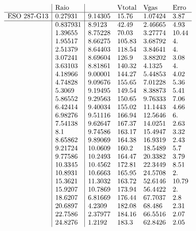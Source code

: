 \documentclass{article}
\begin{document}
\begin{doublespace}
\noindent\(\begin{array}{l|l|llll}
  & \text{Raio} & \text{} & \text{Vtotal} & \text{Vgas} & \text{Erro} \\
\hline
 \text{ESO 287-G13} & 0.27931 & 9.14305 & 15.76 & 1.07424 & 3.87 \\
\hline
  & 0.837931 & 8.9123 & 42.49 & 2.46665 & 4.93 \\
  & 1.39655 & 8.75228 & 70.03 & 3.27774 & 10.44 \\
  & 1.95517 & 8.66275 & 105.83 & 3.68792 & 4. \\
  & 2.51379 & 8.64403 & 118.54 & 3.84641 & 4. \\
  & 3.07241 & 8.69604 & 126.9 & 3.88202 & 3.08 \\
  & 3.63103 & 8.81861 & 140.32 & 4.1325 & 4. \\
  & 4.18966 & 9.00001 & 144.27 & 5.44853 & 4.02 \\
  & 4.74828 & 9.09676 & 155.65 & 7.01228 & 5.36 \\
  & 5.3069 & 9.19495 & 149.54 & 8.38873 & 5.41 \\
  & 5.86552 & 9.29563 & 150.65 & 9.76333 & 7.06 \\
  & 6.42414 & 9.40034 & 155.02 & 11.1443 & 4.66 \\
  & 6.98276 & 9.51116 & 166.94 & 12.5646 & 6. \\
  & 7.54138 & 9.62647 & 167.37 & 14.0251 & 2.63 \\
  & 8.1 & 9.74586 & 163.17 & 15.4947 & 3.32 \\
  & 8.65862 & 9.89069 & 164.38 & 16.9319 & 2.43 \\
  & 9.21724 & 10.0609 & 160.2 & 18.5489 & 5.7 \\
  & 9.77586 & 10.2493 & 164.47 & 20.3382 & 3.79 \\
  & 10.3345 & 10.4562 & 172.81 & 22.3449 & 8.51 \\
  & 10.8931 & 10.6663 & 165.95 & 24.5708 & 2. \\
  & 15.3621 & 11.3032 & 163.72 & 52.6146 & 10.79 \\
  & 15.9207 & 10.7869 & 173.94 & 56.4422 & 2. \\
  & 18.6207 & 6.81669 & 176.44 & 67.7037 & 2.8 \\
  & 20.6897 & 4.2309 & 182.08 & 68.486 & 2.31 \\
  & 22.7586 & 2.37977 & 184.16 & 66.5516 & 2.07 \\
  & 24.8276 & 1.2192 & 183.3 & 62.8426 & 2.05 \\
\end{array}\)
\end{doublespace}
\end{document}
